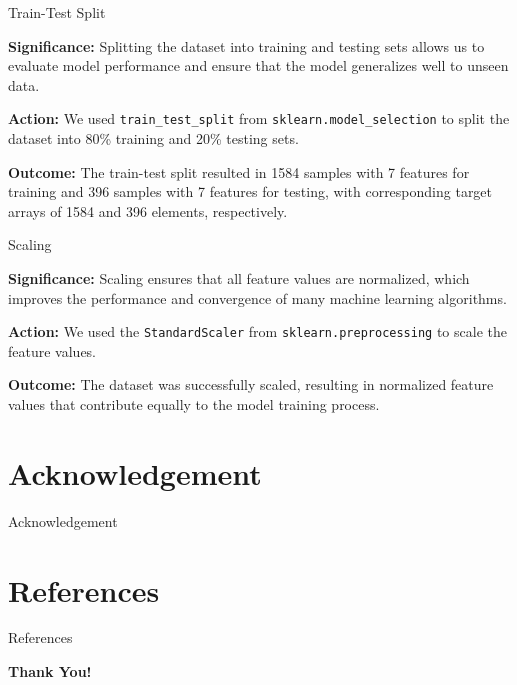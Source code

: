 \documentclass[14pt, aspectratio=169]{beamer}
\begin{document}
\begin{frame}[allowframebreaks]{Train-Test Split}
  \begin{block}{}
    \textbf{Significance:} \small
    Splitting the dataset into training and testing sets allows us to evaluate model performance and ensure that the model generalizes well to unseen data.
  \end{block}
  \begin{block}{}
    \textbf{Action:} \small
    We used \texttt{train\_test\_split} from \texttt{sklearn.model\_selection} to split the dataset into 80\% training and 20\% testing sets.
  \end{block}
  \begin{block}{}
    \textbf{Outcome:} \small
    The train-test split resulted in 1584 samples with 7 features for training and 396 samples with 7 features for testing, with corresponding target arrays of 1584 and 396 elements, respectively.
  \end{block}
\end{frame}

\begin{frame}[allowframebreaks]{Scaling}
  \begin{block}{}
    \textbf{Significance:} \small
    Scaling ensures that all feature values are normalized, which improves the performance and convergence of many machine learning algorithms.
  \end{block}
  \begin{block}{}
    \textbf{Action:} \small
    We used the \texttt{StandardScaler} from \texttt{sklearn.preprocessing} to scale the feature values.
  \end{block}
  \begin{block}{}
    \textbf{Outcome:} \small
    The dataset was successfully scaled, resulting in normalized feature values that contribute equally to the model training process.
  \end{block}
\end{frame}
\section{Acknowledgement}
\begin{frame}{Acknowledgement}
\end{frame}

\section{References}
\begin{frame}{References}
\end{frame}

\begin{frame}{}
  \Huge
  \centering
  \textbf{Thank You!}
\end{frame}
\end{document}
